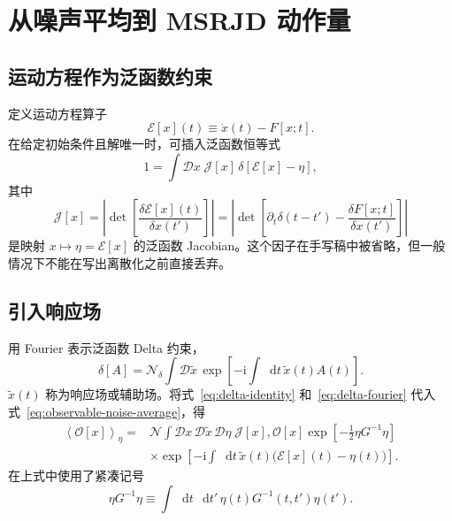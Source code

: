 \documentclass[UTF8,11pt,a4paper]{ctexart}
\newcommand{\dd}{\mathop{}\!\mathrm{d}}
\newcommand{\ii}{\mathrm{i}}
\newcommand{\D}{\mathcal D}
\newcommand{\E}{\mathcal E}
\newcommand{\Jdet}{\mathcal J}
\newcommand{\avg}[1]{\left\langle #1\right\rangle}
\begin{document}
\section{从噪声平均到 MSRJD 动作量}

\subsection{运动方程作为泛函数约束}

定义运动方程算子
\begin{equation}
  \E[x](t)\equiv \dot x(t)-F[x;t].
\end{equation}
在给定初始条件且解唯一时，可插入泛函数恒等式
\begin{equation}
  1=\int\D x\;\Jdet[x]\,
  \delta\!\left[\E[x]-\eta\right],
  \label{eq:delta-identity}
\end{equation}
其中
\begin{equation}
  \Jdet[x]
  =\left|\det\!\left[
    \frac{\delta \E[x](t)}{\delta x(t')}
  \right]\right|
  =\left|\det\!\left[
    \partial_t\delta(t-t')
    -\frac{\delta F[x;t]}{\delta x(t')}
  \right]\right|
  \label{eq:jacobian}
\end{equation}
是映射 $x\mapsto\eta=\E[x]$ 的泛函数 Jacobian。这个因子在手写稿中被省略，但一般情况下不能在写出离散化之前直接丢弃。

\subsection{引入响应场}

用 Fourier 表示泛函数 Delta 约束，
\begin{equation}
  \delta[A]
  =\mathcal N_\delta
   \int\D\widetilde x\,
   \exp\!\left[-\ii\int\dd t\,
   \widetilde x(t)A(t)\right].
  \label{eq:delta-fourier}
\end{equation}
$\widetilde x(t)$ 称为响应场或辅助场。将式~\eqref{eq:delta-identity} 和~\eqref{eq:delta-fourier} 代入式~\eqref{eq:observable-noise-average}，得
\begin{align}
  \avg{\mathcal O[x]}_\eta
  ={}&\mathcal N
  \int\D x\,\D\widetilde x\,\D\eta\;
  \Jdet[x],\mathcal O[x]
  \exp\!\left[-\frac12\eta G^{-1}\eta\right]
  \nonumber\\
  &\times
  \exp\!\left[
  -\ii\int\dd t\,\widetilde x(t)
  \bigl(\E[x](t)-\eta(t)\bigr)
  \right].
  \label{eq:before-noise-integration}
\end{align}
在上式中使用了紧凑记号
\begin{equation*}
  \eta G^{-1}\eta
  \equiv\int\dd t\,\dd t'\,
  \eta(t)G^{-1}(t,t')\eta(t').
\end{equation*}
\end{document}
